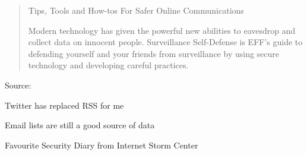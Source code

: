\documentclass[20pt,landscape,a4paper,footrule]{foils}
\begin{document}


\begin{quote}
\centerline{Tips, Tools and How-tos For Safer Online Communications}

Modern technology has given the powerful new abilities to eavesdrop and collect data on innocent people. Surveillance Self-Defense is EFF's guide to defending yourself and your friends from surveillance by using secure technology and developing careful practices.
\end{quote}

Source: 




\begin{list1}
\item Twitter has replaced RSS for me
\item Email lists are still a good source of data
\item Favourite Security Diary from Internet Storm Center\\
 \\
\end{list1}


\myquestionspage
\end{document}
